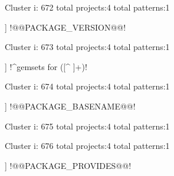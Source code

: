 Cluster i: 672
total projects:4
total patterns:1
\begin{multicols}{1}
\begin{description}[noitemsep,topsep=0pt]
\item [[4] ] \cverb!@@PACKAGE_VERSION@@!
\end{description}
\end{multicols}







Cluster i: 673
total projects:4
total patterns:1
\begin{multicols}{1}
\begin{description}[noitemsep,topsep=0pt]
\item [[4] ] \cverb!^gemsets for ([^ ]+)!
\end{description}
\end{multicols}







Cluster i: 674
total projects:4
total patterns:1
\begin{multicols}{1}
\begin{description}[noitemsep,topsep=0pt]
\item [[4] ] \cverb!@@PACKAGE_BASENAME@@!
\end{description}
\end{multicols}







Cluster i: 675
total projects:4
total patterns:1
\begin{multicols}{1}
\end{multicols}







Cluster i: 676
total projects:4
total patterns:1
\begin{multicols}{1}
\begin{description}[noitemsep,topsep=0pt]
\item [[4] ] \cverb!@@PACKAGE_PROVIDES@@!
\end{description}
\end{multicols}







